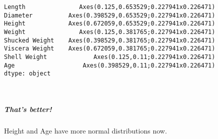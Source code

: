 \documentclass[11pt]{article}
\makeatletter
\newcommand{\boxspacing}{\kern\kvtcb@left@rule\kern\kvtcb@boxsep}
\newcommand{\prompt}[4]{
        {\ttfamily\llap{{\color{#2}[#3]:\hspace{3pt}#4}}\vspace{-\baselineskip}}
    }
\makeatother
\begin{document}
            \begin{tcolorbox}[breakable, size=fbox, boxrule=.5pt, pad at break*=1mm, opacityfill=0]
\prompt{Out}{outcolor}{11}{\boxspacing}
\begin{Verbatim}[commandchars=\\\{\}]
Length               Axes(0.125,0.653529;0.227941x0.226471)
Diameter          Axes(0.398529,0.653529;0.227941x0.226471)
Height            Axes(0.672059,0.653529;0.227941x0.226471)
Weight               Axes(0.125,0.381765;0.227941x0.226471)
Shucked Weight    Axes(0.398529,0.381765;0.227941x0.226471)
Viscera Weight    Axes(0.672059,0.381765;0.227941x0.226471)
Shell Weight             Axes(0.125,0.11;0.227941x0.226471)
Age                   Axes(0.398529,0.11;0.227941x0.226471)
dtype: object
\end{Verbatim}
\end{tcolorbox}
        
    \begin{center}
    \end{center}
    { \hspace*{\fill} \\}
    
    \subparagraph{That's better!}\label{thats-better}

Height and Age have more normal distributions now.
\end{document}
